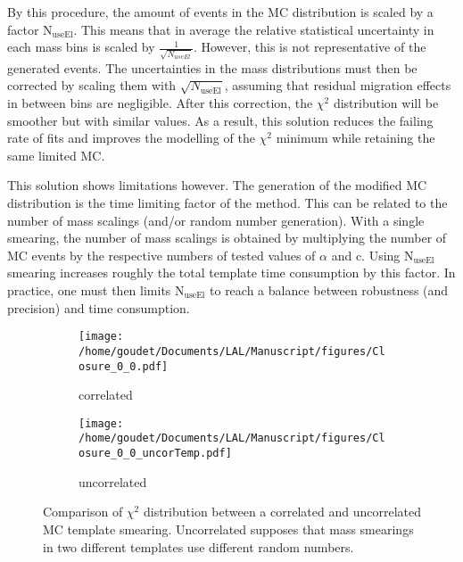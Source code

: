By this procedure, the amount of events in the MC distribution is scaled by a factor N\(_{\text{useEl}}\).
This means that in average the relative statistical uncertainty in each mass bins is scaled by \(\frac{1}{\sqrt{N_{useEl}}}\).
However, this is not representative of the generated events.
The uncertainties in the mass distributions must then be corrected by scaling them with \(\sqrt{N_\text{useEl}}\), assuming that residual migration effects in between bins are negligible.
After this correction, the $\chi^2$ distribution will be smoother but with similar values.
As a result, this solution reduces the failing rate of fits and improves the modelling of the $\chi^2$ minimum while retaining the same limited MC.

This solution shows limitations however.
The generation of the modified MC distribution is the time limiting factor of the method.
This can be related to the number of mass scalings (and/or random number generation).
With a single smearing, the number of mass scalings is obtained by multiplying the number of MC events by the respective numbers of tested values of \(\alpha\) and c.
Using N\(_{\text{useEl}}\) smearing increases roughly the total template time consumption by this factor.
In practice, one must then limits N\(_{\text{useEl}}\) to reach a balance between robustness (and precision) and time consumption.


\begin{figure}
\begin{subfigure}[t]{0.49\linewidth}
\begin{center}
\texttt{[image: /home/goudet/Documents/LAL/Manuscript/figures/Closure\_0\_0.pdf]}
\end{center}
\caption{correlated}
\end{subfigure}
\begin{subfigure}[t]{0.49\linewidth}
\begin{center}
\texttt{[image: /home/goudet/Documents/LAL/Manuscript/figures/Closure\_0\_0\_uncorTemp.pdf]}
\end{center}
\caption{uncorrelated}
\end{subfigure}
\caption{\label{orgff6a45b}
Comparison of $\chi^2$ distribution between a correlated and uncorrelated MC template smearing. Uncorrelated supposes that mass smearings in two different templates use different random numbers.}
\end{figure}



